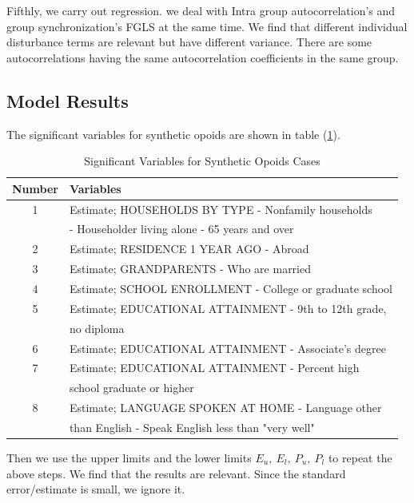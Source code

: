 \documentclass{mcmthesis}
\numberwithin{equation}{section}
\numberwithin{figure}{section}
\numberwithin{table}{section}
\theoremstyle{mydef}
\begin{document}
Fifthly, we carry out regression. we deal with Intra group autocorrelation's and group synchronization's FGLS at the same time. We find that different individual disturbance terms are relevant but have different variance. There are some autocorrelations having the same autocorrelation coefficients in the same group.

\subsection{Model Results}
The significant variables for synthetic opoids are shown in table (\ref{tab:sov}).

\begin{table}[htbp]
  \centering
  \caption{Significant Variables for Synthetic Opoids Cases}
    \begin{tabular}{cl}
    \addlinespace
    \toprule[1.5pt]
    Number & Variables \\
    \midrule[1pt]
    
    1     & Estimate; HOUSEHOLDS BY TYPE - Nonfamily households\\
    & - Householder living alone - 65 years and over \\
    2     & Estimate; RESIDENCE 1 YEAR AGO - Abroad \\
    3     & Estimate; GRANDPARENTS - Who are married \\
    4     & Estimate; SCHOOL ENROLLMENT - College or graduate school \\
    5     & Estimate; EDUCATIONAL ATTAINMENT - 9th to 12th grade, \\
    &no diploma \\
    6     & Estimate; EDUCATIONAL ATTAINMENT - Associate's degree \\
    7     & Estimate; EDUCATIONAL ATTAINMENT - Percent high \\
    & school graduate or higher \\
    8     & Estimate; LANGUAGE SPOKEN AT HOME - Language other \\
    &than English - Speak English less than "very well" \\

    \bottomrule[1.5pt]
    \end{tabular}%
  \label{tab:sov}%
\end{table}%

Then we use the upper limits and the lower limits $E_u,\ E_l, \ P_u,\ P_l$ to repeat the above steps. We find that the results are relevant. Since the  standard error/estimate is small, we ignore it.
\end{document}
